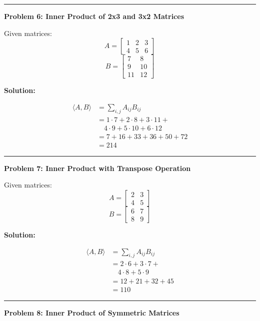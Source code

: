 \documentclass[
  letterpaper,
  DIV=11,
  numbers=noendperiod]{scrreprt}
\theoremstyle{plain}
\theoremstyle{definition}
\theoremstyle{remark}
\begin{document}
\begin{center}\rule{0.5\linewidth}{0.5pt}\end{center}

\textbf{Problem 6: Inner Product of 2x3 and 3x2 Matrices}

Given matrices: \[A=\begin{bmatrix}1&2&3\\4&5&6\end{bmatrix}\]
\[B=\begin{bmatrix}7&8\\9&10\\11&12\end{bmatrix}\]

\textbf{Solution:}

\begin{align*}
\langle A,B \rangle &= \sum_{i,j} A_{ij} B_{ij} \\
&= 1\cdot7 + 2\cdot8 + 3\cdot11 + \\
&\quad 4\cdot9 + 5\cdot10 + 6\cdot12 \\
&= 7 + 16 + 33 + 36 + 50 + 72 \\
&= 214
\end{align*}

\begin{center}\rule{0.5\linewidth}{0.5pt}\end{center}

\textbf{Problem 7: Inner Product with Transpose Operation}

Given matrices: \[A=\begin{bmatrix}2&3\\4&5\end{bmatrix}\]
\[B=\begin{bmatrix}6&7\\8&9\end{bmatrix}\]

\textbf{Solution:}

\begin{align*}
\langle A,B \rangle &= \sum_{i,j} A_{ij} B_{ij} \\
&= 2\cdot6 + 3\cdot7 + \\
&\quad 4\cdot8 + 5\cdot9 \\
&= 12 + 21 + 32 + 45 \\
&= 110
\end{align*}

\begin{center}\rule{0.5\linewidth}{0.5pt}\end{center}

\textbf{Problem 8: Inner Product of Symmetric Matrices}
\end{document}
